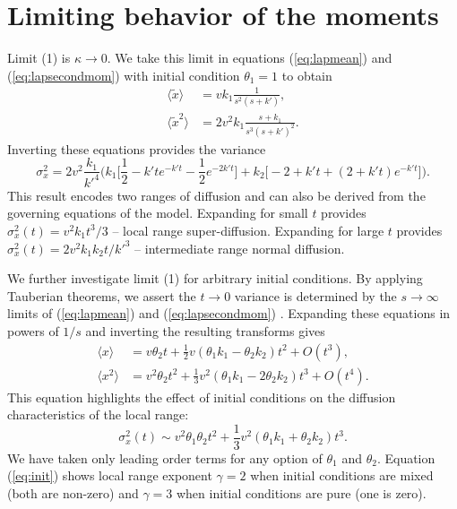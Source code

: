 \documentclass[draft,grl]{agujournal2018}
\newcommand\be{\begin{equation}}
\newcommand\ee{\end{equation}}
\newcommand\bra{\langle}
\newcommand\ket{\rangle}
\begin{document}
\section{Limiting behavior of the moments}
\label{sec:appendixC}

Limit (1) is $\kappa \rightarrow 0$. We take this limit in equations (\ref{eq:lapmean}) and (\ref{eq:lapsecondmom}) with initial condition $\theta_1=1$ to obtain
\begin{align}
\bra \tilde{x} \ket &= vk_1 \frac{1 }{s^2(s+k')}, \label{eq:li1}\\
\bra \tilde{x}^2 \ket &= 2v^2k_1 \frac{s+k_1}{s^3(s+k')^2}. \label{eq:li2}
\end{align}
Inverting these equations provides the variance
\be \sigma_x^2 = 2v^2\frac{k_1}{k'^4}\Big(k_1\big[\frac{1}{2} - k'te^{-k't} - \frac{1}{2} e^{-2k't}\big] + k_2\big[-2+k't + (2+k't)e^{-k't}\big]\Big).\label{eq:li}\ee
This result encodes two ranges of diffusion and can also be derived from the governing equations of the \citet{Lisle1998} model.
Expanding for small $t$ provides $\sigma_x^2(t) = v^2k_1t^3/3$ -- local range super-diffusion.
Expanding for large $t$ provides $\sigma_x^2(t) = 2v^2k_1k_2t/k'^3$ -- intermediate range normal diffusion.

We further investigate limit (1) for arbitrary initial conditions.
By applying Tauberian theorems, we assert the $ t \rightarrow 0$ variance is determined by the $s\rightarrow \infty$ limits of (\ref{eq:lapmean}) and (\ref{eq:lapsecondmom}) \citep[e.g.,][]{Weiss1994, Weeks1998}.  
Expanding these equations in powers of $1/s$ and inverting the resulting transforms gives
\begin{align} \bra x \ket &= v \theta_2 t + \frac{1}{2}v(\theta_1k_1-\theta_2k_2)t^2 + O(t^3),\\
\bra x^2 \ket &= v^2\theta_2 t^2 + \frac{1}{3}v^2(\theta_1k_1-2\theta_2k_2)t^3+ O(t^4).
\end{align}
This equation highlights the effect of initial conditions on the diffusion characteristics of the local range:
\be \sigma_x^2(t) \sim v^2\theta_1\theta_2t^2 + \frac{1}{3}v^2(\theta_1k_1+\theta_2k_2)t^3.\label{eq:init}\ee
We have taken only leading order terms for any option of $\theta_1$ and $\theta_2$.
Equation (\ref{eq:init}) shows local range exponent $\gamma=2$ when initial conditions are mixed (both are non-zero) and $\gamma=3$ when initial conditions are pure (one is zero).
\end{document}
